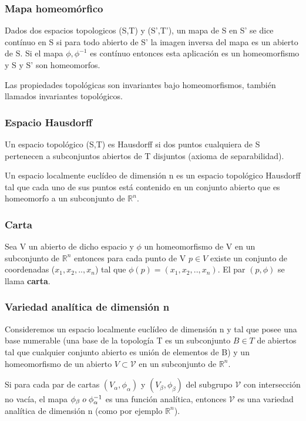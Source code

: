 \documentclass{article}
\begin{document}
 \subsubsection{Mapa homeomórfico}

 Dados dos espacios topologicos (S,T) y (S',T'), un mapa de S en S' se dice contínuo en S si para todo abierto de S' la imagen inversa del mapa es un abierto de S. Si el mapa $\phi , \phi ^{-1}$ es contínuo entonces esta aplicación es un homeomorfismo y S y S' son homeomorfos.

 \smallskip
 Las propiedades topológicas son invariantes bajo homeomorfismos, también llamados invariantes topológicos.

 \subsubsection{Espacio Hausdorff}

 Un espacio topológico (S,T) es Hausdorff si dos puntos cualquiera de S pertenecen a subconjuntos abiertos de T disjuntos (axioma de separabilidad).

 Un espacio localmente euclídeo de dimensión n es un espacio topológico Hausdorff tal que cada uno de sus puntos está contenido en un conjunto abierto que es homeomorfo a un subconjunto de $\mathds{R}^n$.


 \subsubsection{Carta}
 Sea V un abierto de dicho espacio y $\phi$ un homeomorfismo de V en un subconjunto de $\mathds{R}^n$ entonces para cada punto de V $p\in V$ existe un conjunto de coordenadas ($x_1,x_2,..,x_n$) tal que $\phi (p)= (x_1,x_2,..,x_n) $. El par $(p, \phi)$ se llama \textbf{carta}.

 \subsubsection{Variedad analítica de dimensión n}

 Consideremos un espacio localmente euclídeo de dimensión n y tal que posee una base numerable (una base de la topología T es un subconjunto $B \in T$ de abiertos tal que cualquier conjunto abierto es unión de elementos de B) y un homeomorfismo de un abierto $V \subset \mathcal{V}$ en un subconjunto de $\mathds{R}^n$.

 \smallskip
 Si para cada par de cartas $(V_\alpha , \phi _\alpha)$ y $(V_\beta , \phi _\beta)$ del subgrupo $\mathcal{V}$ con intersección no vacía, el mapa $\phi _\beta  \hspace{0.1cm} o \hspace{0.1cm} \phi _\alpha ^{-1}$ es una función analítica, entonces $\mathcal{V}$ es una variedad analítica de dimensión n (como por ejemplo $\mathds{R}^n$).
\end{document}
